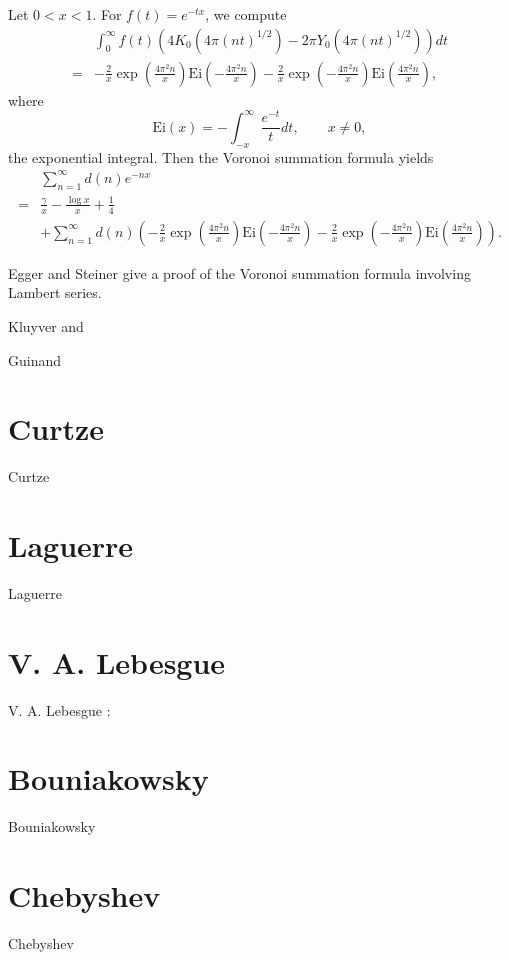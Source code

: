 \documentclass{amsart}
\newcommand{\Ei}{\mathrm{Ei}}
\begin{document}
Let $0<x<1$. For $f(t)=e^{-tx}$, we compute 
\[
\begin{split}
&\int_0^\infty f(t)(4K_0(4\pi(nt)^{1/2})-2\pi Y_0(4\pi(nt)^{1/2})) dt\\
=&
-\frac{2}{x}\exp\left(\frac{4\pi^2 n}{x}\right) \Ei\left(-\frac{4\pi^2 n}{x}\right)
-\frac{2}{x}\exp\left(-\frac{4\pi^2 n}{x}\right) \Ei\left(\frac{4\pi^2 n}{x}\right),
\end{split}
\]
where
\[
\Ei(x) = -\int_{-x}^\infty \frac{e^{-t}}{t} dt, \qquad x \neq 0,
\]
the exponential integral.
Then the Voronoi summation formula yields
\[
\begin{split}
&\sum_{n=1}^\infty d(n) e^{-nx}\\
=& \frac{\gamma}{x} - \frac{\log x}{x} + \frac{1}{4}\\
&+ \sum_{n=1}^\infty d(n)
\left(
-\frac{2}{x}\exp\left(\frac{4\pi^2 n}{x}\right) \Ei\left(-\frac{4\pi^2 n}{x}\right)
-\frac{2}{x}\exp\left(-\frac{4\pi^2 n}{x}\right) \Ei\left(\frac{4\pi^2 n}{x}\right)
\right).
\end{split}
\]


Egger and Steiner \cite{egger} give a proof  of the Voronoi summation formula involving Lambert series.

Kluyver \cite{kluyver1919} and \cite{kluyver1922}

Guinand \cite{guinand}

\section{Curtze}
Curtze \cite{curtze}


\section{Laguerre}
Laguerre \cite{laguerre}


\section{V. A. Lebesgue}
V. A. Lebesgue \cite{lebesgue}:





\section{Bouniakowsky}
Bouniakowsky \cite{bouniakowsky}


\section{Chebyshev}
Chebyshev \cite{tchebychef}
\end{document}
